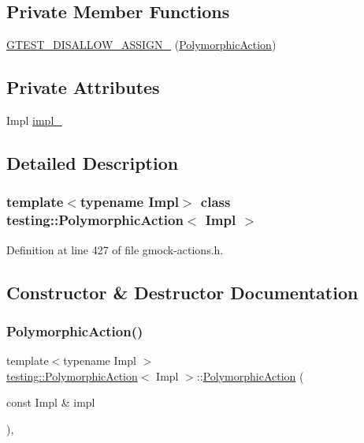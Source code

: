 \subsection*{Private Member Functions}
\begin{DoxyCompactItemize}
\item 
\hyperlink{classtesting_1_1PolymorphicAction_a12db33e1d2f389637961994c851c97b6}{G\+T\+E\+S\+T\+\_\+\+D\+I\+S\+A\+L\+L\+O\+W\+\_\+\+A\+S\+S\+I\+G\+N\+\_\+} (\hyperlink{classtesting_1_1PolymorphicAction}{Polymorphic\+Action})
\end{DoxyCompactItemize}
\subsection*{Private Attributes}
\begin{DoxyCompactItemize}
\item 
Impl \hyperlink{classtesting_1_1PolymorphicAction_ac072ea4c539fd1c6be75798fe9d801f4}{impl\+\_\+}
\end{DoxyCompactItemize}


\subsection{Detailed Description}
\subsubsection*{template$<$typename Impl$>$\newline
class testing\+::\+Polymorphic\+Action$<$ Impl $>$}



Definition at line 427 of file gmock-\/actions.\+h.



\subsection{Constructor \& Destructor Documentation}
\mbox{\label{classtesting_1_1PolymorphicAction_a062e5a45ad61dcf8085b15cc882ca0ae}} 
\subsubsection{\texorpdfstring{Polymorphic\+Action()}{PolymorphicAction()}}
{\footnotesize\ttfamily template$<$typename Impl $>$ \\
\hyperlink{classtesting_1_1PolymorphicAction}{testing\+::\+Polymorphic\+Action}$<$ Impl $>$\+::\hyperlink{classtesting_1_1PolymorphicAction}{Polymorphic\+Action} (\begin{DoxyParamCaption}\item[{const Impl \&}]{impl }\end{DoxyParamCaption})\hspace{0.3cm}{\ttfamily [inline]}, {\ttfamily [explicit]}}



